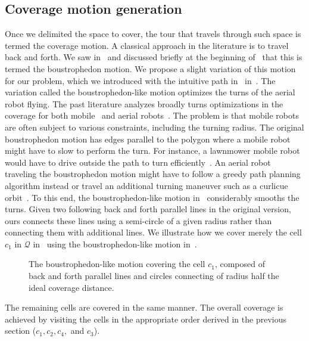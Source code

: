 
\subsection{Coverage motion generation}
\label{sec:cov-motion}

Once we delimited the space to cover, the tour that travels through such space is termed the coverage motion. A classical approach in the literature is to travel back and forth. We saw in~ and discussed briefly at the beginning of~ that this is termed the boustrophedon motion. We propose a slight variation of this motion for our problem, which we introduced with the intuitive path in~ in~. The variation called the boustrophedon-like motion optimizes the turns of the aerial robot flying. The past literature analyzes broadly turns optimizations in the coverage for both mobile~\citep{huang2001optimal} and aerial robots~\citep{artemenko2016energy,li2011coverage}. The problem is that mobile robots are often subject to various constraints, including the turning radius. The original boustrophedon motion has edges parallel to the polygon where a mobile robot might have to slow to perform the turn. For instance, a lawnmower mobile robot would have to drive outside the path to turn efficiently~\citep{huang2001optimal}. An aerial robot traveling the boustrophedon motion might have to follow a greedy path planning algorithm instead or travel an additional turning maneuver such as a curlicue orbit~\citep{xu2011optimal,xu2014efficient}. To this end, the boustrophedon-like motion in~ considerably smooths the turns. Given two following back and forth parallel lines in the original version, ours connects these lines using a semi-circle of a given radius rather than connecting them with additional lines. We illustrate how we cover merely the cell $c_1$ in $\mathcal{Q}$ in~ using the boustrophedon-like motion in~. 
\begin{figure}[h]
  \centering
  \selectfont
  
  \caption[Boustrophedon-like motion covering a cell]{The boustrophedon-like motion covering the cell $c_1$, composed of back and forth parallel lines and circles connecting of radius half the ideal coverage distance.}
  \label{fig:bm}
\end{figure}
The remaining cells are covered in the same manner. The overall coverage is achieved by visiting the cells in the appropriate order derived in the previous section ($c_1,c_2,c_4,$ and $c_3$).

